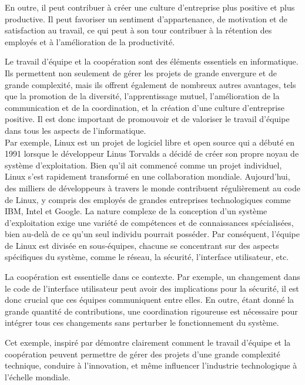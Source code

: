 En outre, il peut contribuer à créer une culture d'entreprise plus positive et plus productive. Il peut favoriser un sentiment d'appartenance, de motivation et de satisfaction au travail, ce qui peut à son tour contribuer à la rétention des employés et à l'amélioration de la productivité.

Le travail d'équipe et la coopération sont des éléments essentiels en informatique. Ils permettent non seulement de gérer les projets de grande envergure et de grande complexité, mais ils offrent également de nombreux autres avantages, tels que la promotion de la diversité, l'apprentissage mutuel, l'amélioration de la communication et de la coordination, et la création d'une culture d'entreprise positive. Il est donc important de promouvoir et de valoriser le travail d'équipe dans tous les aspects de l'informatique.\\

Par exemple, Linux est un projet de logiciel libre et open source qui a débuté en 1991 lorsque le développeur Linus Torvalds a décidé de créer son propre noyau de système d'exploitation. Bien qu'il ait commencé comme un projet individuel, Linux s'est rapidement transformé en une collaboration mondiale. Aujourd'hui, des milliers de développeurs à travers le monde contribuent régulièrement au code de Linux, y compris des employés de grandes entreprises technologiques comme IBM, Intel et Google. La nature complexe de la conception d'un système d'exploitation exige une variété de compétences et de connaissances spécialisées, bien au-delà de ce qu'un seul individu pourrait posséder. Par conséquent, l'équipe de Linux est divisée en sous-équipes, chacune se concentrant sur des aspects spécifiques du système, comme le réseau, la sécurité, l'interface utilisateur, etc.

La coopération est essentielle dans ce contexte. Par exemple, un changement dans le code de l'interface utilisateur peut avoir des implications pour la sécurité, il est donc crucial que ces équipes communiquent entre elles. En outre, étant donné la grande quantité de contributions, une coordination rigoureuse est nécessaire pour intégrer tous ces changements sans perturber le fonctionnement du système.

Cet exemple, inspiré par \cite{torvalds2002just} démontre clairement comment le travail d'équipe et la coopération peuvent permettre de gérer des projets d'une grande complexité technique, conduire à l'innovation, et même influencer l'industrie technologique à l'échelle mondiale.

